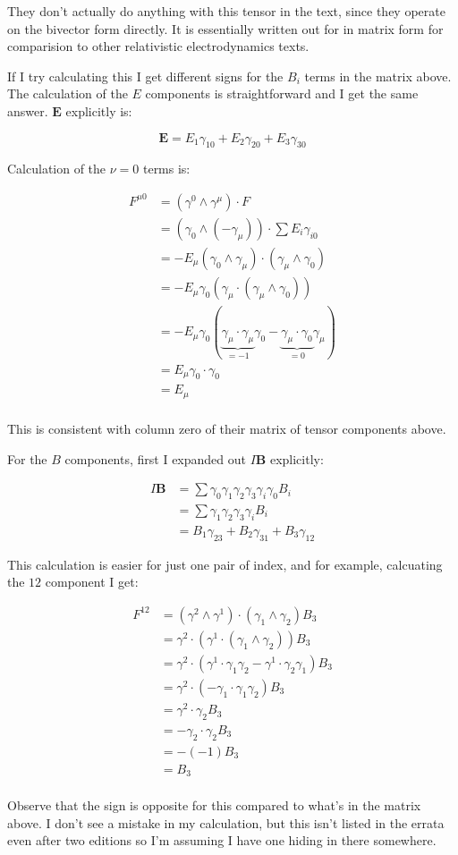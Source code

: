 \documentclass{article}      %
\begin{document}
They don't actually do anything with this tensor in the text, since they operate on the bivector form directly.  It is essentially written out for in matrix form for comparision to other relativistic electrodynamics texts.

If I try calculating this I get different signs for the $B_i$ terms in the matrix above.  The 
calculation of the $E$ components is straightforward and I get the same answer.  $\mathbf{E}$ explicitly is:

\[
\mathbf{E} = E_1 \gamma_{10} + E_2 \gamma_{20} + E_3 \gamma_{30}
\]

Calculation of the $\nu = 0$ terms is:

\begin{align*}
F^{\mu 0} 
&= (\gamma^0 \wedge \gamma^\mu) \cdot F \\
&= (\gamma_0 \wedge (-\gamma_\mu)) \cdot \sum E_i \gamma_{i0} \\
&= -E_\mu (\gamma_0 \wedge \gamma_\mu) \cdot (\gamma_\mu \wedge \gamma_{0}) \\
&= -E_\mu \gamma_0 (\gamma_\mu \cdot (\gamma_\mu \wedge \gamma_{0})) \\
&= -E_\mu \gamma_0 ( \underbrace{\gamma_\mu \cdot \gamma_\mu}_{=-1} \gamma_{0} - \underbrace{\gamma_\mu \cdot \gamma_{0}}_{=0} \gamma_\mu) \\
&= E_\mu \gamma_0 \cdot \gamma_0 \\
&= E_\mu \\
\end{align*}

This is consistent with column zero of their matrix of tensor components above.

For the $B$ components, first I expanded out $I\mathbf{B}$ explicitly:

\begin{align*}
I\mathbf{B} 
&= \sum \gamma_0 \gamma_1 \gamma_2 \gamma_3 \gamma_i \gamma_0 B_i \\
&= \sum \gamma_1 \gamma_2 \gamma_3 \gamma_i B_i \\
&= B_1 \gamma_{23} + B_2 \gamma_{31} + B_3 \gamma_{12}
\end{align*}

This calculation is easier for just one pair of index, and for example, calcuating the $12$ component I get:

\begin{align*}
F^{12} 
&= (\gamma^2 \wedge \gamma^1) \cdot ( \gamma_1 \wedge \gamma_2 ) B_3 \\
&= \gamma^2 \cdot (\gamma^1 \cdot ( \gamma_1 \wedge \gamma_2 )) B_3 \\
&= \gamma^2 \cdot ( \gamma^1 \cdot \gamma_1 \gamma_2 - \gamma^1 \cdot \gamma_2 \gamma_1 ) B_3 \\
&= \gamma^2 \cdot ( -\gamma_1 \cdot \gamma_1 \gamma_2 ) B_3 \\
&= \gamma^2 \cdot \gamma_2 B_3 \\
&= - \gamma_2 \cdot \gamma_2 B_3 \\
&= - (-1) B_3 \\
&= B_3 \\
\end{align*}

Observe that the sign is opposite for this compared to what's in the matrix above.  I don't see a mistake in my calculation, but this isn't listed in the errata even after two editions
so I'm assuming I have one hiding in there somewhere.
\end{document}
